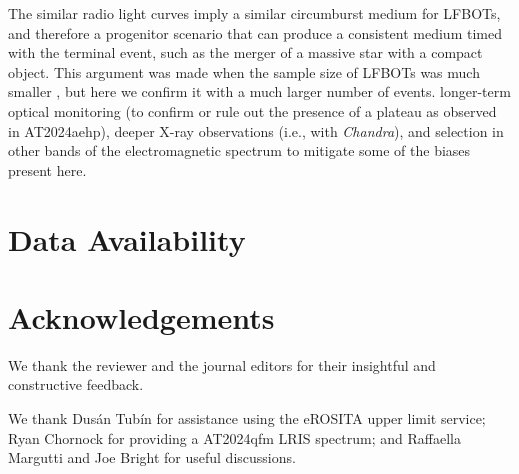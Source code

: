 \documentclass[twocolumn,twocolappendix, linenumbers, trackchanges]{aastex7}
\begin{document}
The similar radio light curves imply a similar circumburst medium for LFBOTs, and therefore a progenitor scenario that can produce a consistent medium timed with the terminal event, such as the merger of a massive star with a compact object. This argument was made when the sample size of LFBOTs was much smaller \citep{metzger2022}, but here we confirm it with a much larger number of events. 
 longer-term optical monitoring (to confirm or rule out the presence of a plateau as observed in AT2024aehp), deeper X-ray observations (i.e., with \emph{Chandra}), and selection in other bands of the electromagnetic spectrum to mitigate some of the biases present here. 

\section{Data Availability}

\section{Acknowledgements}
We thank the reviewer and the journal editors for their insightful and constructive feedback.

We thank Dusán Tubín for assistance using the eROSITA upper limit service; Ryan Chornock for providing a AT2024qfm LRIS spectrum; and Raffaella Margutti and Joe Bright for useful discussions.
\end{document}
